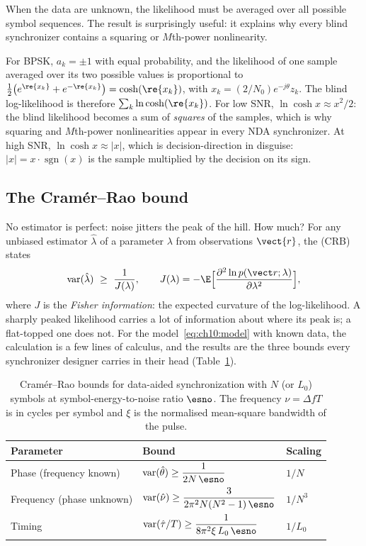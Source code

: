 When the data are unknown, the likelihood must be averaged over all possible symbol sequences.
The result is surprisingly useful: it explains why every blind synchronizer contains a squaring
or $M$th-power nonlinearity.

\begin{deeper}
For BPSK, $a_k=\pm1$ with equal probability, and the likelihood of one sample averaged over its
two possible values is proportional to
$\tfrac12\bigl(e^{\re\{x_k\}}+e^{-\re\{x_k\}}\bigr)=\cosh(\re\{x_k\})$, with
$x_k=(2/N_0)e^{-j\theta}z_k$. The blind log-likelihood is therefore $\sum_k\ln\cosh(\re\{x_k\})$.
For low SNR, $\ln\cosh x\approx x^2/2$: the blind likelihood becomes a sum of \emph{squares} of the
samples, which is why squaring and $M$th-power nonlinearities appear in every NDA synchronizer. At
high SNR, $\ln\cosh x\approx|x|$, which is decision-direction in disguise: $|x|=x\cdot\operatorname{sgn}(x)$
is the sample multiplied by the decision on its sign.
\end{deeper}

\subsection{The Cram\'er--Rao bound}

No estimator is perfect: noise jitters the peak of the hill. How much? For any unbiased
estimator $\hat\lambda$ of a parameter $\lambda$ from observations $\vect{r}$, the
 (CRB) states
\begin{equation}
\operatorname{var}(\hat\lambda)\ \ge\ \frac{1}{J(\lambda)},\qquad
J(\lambda)=-\E\Bigl[\frac{\partial^2\ln p(\vect r;\lambda)}{\partial\lambda^2}\Bigr],
\end{equation}
where $J$ is the \emph{Fisher information}: the expected curvature of the log-likelihood. A sharply
peaked likelihood carries a lot of information about where its peak is; a flat-topped one does
not. For the model~\eqref{eq:ch10:model} with known data, the calculation is a few lines of
calculus, and the results are the three bounds every synchronizer designer carries in their head
(Table~\ref{tab:ch10:crb}).

\begin{table}[htbp]\centering\small
\caption{Cram\'er--Rao bounds for data-aided synchronization with $N$ (or $L_0$) symbols at
symbol-energy-to-noise ratio $\esno$. The frequency $\nu=\Delta fT$ is in cycles per symbol and
$\xi$ is the normalised mean-square bandwidth of the pulse.}
\label{tab:ch10:crb}
\begin{tabular}{lll}
\toprule
Parameter & Bound & Scaling \\
\midrule
Phase (frequency known) & $\operatorname{var}(\hat\theta)\ge\dfrac{1}{2N\,\esno}$ & $1/N$ \\[2ex]
Frequency (phase unknown) & $\operatorname{var}(\hat\nu)\ge\dfrac{3}{2\pi^2N(N^2-1)\,\esno}$ & $1/N^3$ \\[2ex]
Timing & $\operatorname{var}(\hat\tau/T)\ge\dfrac{1}{8\pi^2\xi\,L_0\,\esno}$ & $1/L_0$ \\[1.5ex]
\bottomrule
\end{tabular}
\end{table}

